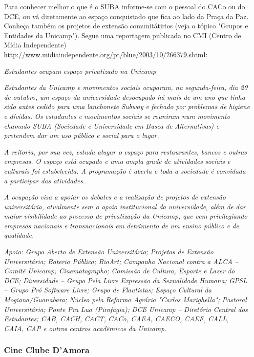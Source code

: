 Para conhecer melhor o que é o SUBA informe-se com o pessoal do CACo ou do DCE,
ou vá diretamente ao espaço conquistado que fica ao lado da Praça da Paz.
Conheça também os projetos de extensão comunitátirios (veja o tópico "Grupos
e Entidades da Unicamp"). Segue uma reportagem publicada no CMI (Centro de Mídia
Independente)
\url{http://www.midiaindependente.org/pt/blue/2003/10/266379.shtml}:

\textit{Estudantes ocupam espaço privatizado na Unicamp}

\textit{Estudantes da Unicamp e movimentos sociais ocuparam, na segunda-feira, dia 20 de outubro, um espaço da universidade desocupado há mais de um ano que tinha sido antes cedido para uma lanchonete Subway e fechado por problemas de higiene e dívidas. Os estudantes e movimentos sociais se reuniram num movimento chamado SUBA (Sociedade e Universidade em Busca de Alternativas) e pretendem dar um uso público e social para o lugar.}

\textit{A reitoria, por sua vez, estuda alugar o espaço para restaurantes, bancos e outras empresas. O espaço está ocupado e uma ampla grade de atividades sociais e culturais foi estabelecida. A programação é aberta e toda a sociedade é convidada a participar das atividades.}

\textit{A ocupação visa a apoiar os debates e a realização de projetos de extensão universitária, atualmente sem o apoio institucional da universidade, além de dar maior visibilidade ao processo de privatização da Unicamp, que vem privilegiando empresas nacionais e transnacionais em detrimento de um ensino público e de qualidade.}

\textit{Apoio: Grupo Aberto de Extensão Universitária; Projetos de Extensão Universitária; Bateria Pública; BioArt; Campanha Nacional contra a ALCA -- Comitê Unicamp; Cinematographo; Comissão de Cultura, Esporte e Lazer do DCE; Diversidade -- Grupo Pela Livre Expressão da Sexualidade Humana; GPSL -- Grupo Pró Software Livre; Grupo de Flautistas; Espaço Cultural da Mogiana/Guanabara; Núcleo pela Reforma Agrária "Carlos Marighella"; Pastoral Universitária; Ponte Pra Lua (Pirofagia); DCE Unicamp -- Diretório Central dos Estudantes; CAB, CACH, CACT, CACo, CAEA, CAECO, CAEF, CALL, CAIA, CAP e outros centros acadêmicos da Unicamp.}

\subsubsection{Cine Clube D'Amora}

